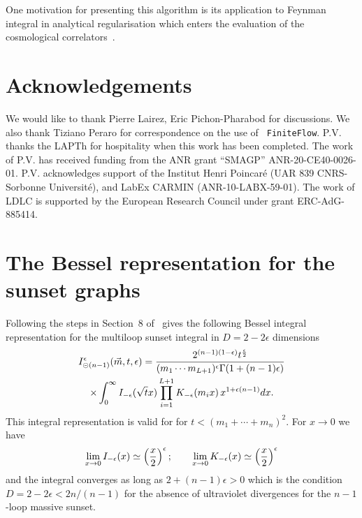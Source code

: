 \documentclass[a4paper,12pt]{article}
\numberwithin{equation}{section}
\numberwithin{figure}{section}
\def\su{\circleddash}
\newcommand{\pvnote}[1]{\sethlcolor{bubblegum} \protect\hl{Pierre V.: #1} \sethlcolor{yellow}}
\begin{document}
One motivation for presenting this algorithm is its application to
Feynman integral in analytical regularisation which enters the evaluation of the cosmological
correlators~\cite{Heckelbacher:2022hbq,Chowdhury:2023khl,Chowdhury:2023arc}. 


\section*{Acknowledgements}
We would like to thank Pierre Lairez,  Eric Pichon-Pharabod  for discussions. We also thank Tiziano Peraro for correspondence on the use of {\tt
	FiniteFlow}. P.V. thanks the LAPTh for hospitality when this
      work has been completed.
The work of P.V. has received funding from the ANR grant ``SMAGP''
ANR-20-CE40-0026-01. P.V. acknowledges support of the Institut Henri
Poincar\'e (UAR 839 CNRS-Sorbonne Universit\'e), and LabEx CARMIN
(ANR-10-LABX-59-01). The work of LDLC is  supported by 
the European Research Council under grant ERC-AdG-885414. 


\appendix\section{The Bessel representation for the sunset graphs}\label{sec:bessel}


Following the steps in Section~8 of~\cite{Vanhove:2014wqa}
gives the following Bessel integral representation for the multiloop
sunset integral in  $D=2-2\epsilon$ dimensions
\begin{multline}
  I_{\su(n-1)}^\epsilon(\vec m,t,\epsilon)=
  {2^{(n-1) (1-\epsilon)} t^{\epsilon\over2} \over    (m_1\cdots m_{L+1})^{\epsilon}
  \Gamma(1+(n-1)\epsilon)}\cr\times\int_0^\infty I_{-\epsilon}(\sqrt{t} x)
  \prod_{i=1}^{L+1}K_{-\epsilon}(m_ix)\,  x^{1+\epsilon(n-1)}dx.
\end{multline}
This integral representation is valid for   for $t<(m_1+\cdots +m_{n})^2$.
%
For $x\to0$ we have
\begin{equation}
  \lim_{x\to0} I_{-\epsilon}(x)\simeq \left(x\over2\right)^{\epsilon};    \qquad
  \lim_{x\to0} K_{-\epsilon}(x)   \simeq \left(x\over2\right)^{\epsilon}
\end{equation}
and the integral converges as long as $2+(n-1)\epsilon>0$ which is the
condition $D=2-2\epsilon< 2n/(n-1)$ for the absence of ultraviolet divergences
for the $n-1$-loop massive sunset.
\end{document}
